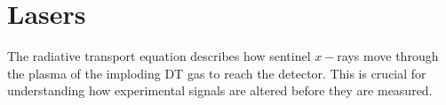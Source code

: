 \section{\label{sec:lasers}Lasers}

The radiative transport equation describes how sentinel $x-$rays move through the plasma of the imploding DT gas to reach the detector. This is crucial for understanding how experimental signals are altered before they are measured.

%
%

\endinput %